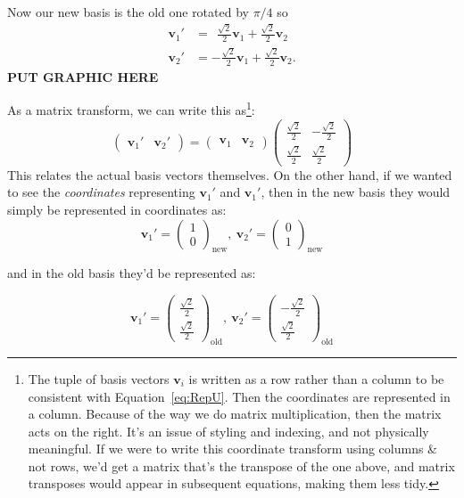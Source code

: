 	Now our new basis is the old one rotated by $\pi/4$ so 
	\begin{align*}
		\mathbf v_1' &= ~~ \frac{\sqrt 2}{2} \mathbf v_1 + \frac{\sqrt 2}{2} \mathbf v_2\\
		\mathbf v_2' &= - \frac{\sqrt 2}{2}\mathbf v_1 + \frac{\sqrt 2}{2}\mathbf v_2.
	\end{align*}
	\textbf{PUT GRAPHIC HERE}
	
	
	As a matrix transform, we can write this as\footnote{The tuple of basis vectors $\mathbf v_i$ is written as a row rather than a column to be consistent with Equation~\eqref{eq:RepU}. Then the coordinates are represented in a column. Because of the way we do matrix multiplication, then the matrix acts on the right. It's an issue of styling and indexing, and not physically meaningful. If we were to write this coordinate transform using columns \& not rows, we'd get a matrix that's the transpose of the one above, and matrix transposes would appear in subsequent equations, making them less tidy.}:
	\begin{equation*}
		\begin{pmatrix}
			\mathbf v_1' & \mathbf v_2'
		\end{pmatrix}
		= 
		\begin{pmatrix}
			\mathbf v_1 & \mathbf v_2
		\end{pmatrix}
		\begin{pmatrix}
					 \frac{\sqrt 2}{2} &  -\frac{\sqrt 2}{2} \\
					 \frac{\sqrt 2}{2} &  \frac{\sqrt 2}{2}
		\end{pmatrix}
	\end{equation*}
	This relates the actual basis vectors themselves. On the other hand, if we wanted to see the \emph{coordinates} representing $\mathbf v_1'$ and $\mathbf v_1'$, then in the new basis they would simply be represented in coordinates as: 
	\begin{equation*}
		\mathbf v_1' = \begin{pmatrix}
			1 \\ 0
		\end{pmatrix}_{\mathrm{new}}, ~
		\mathbf v_2' = \begin{pmatrix}
			0 \\ 1
		\end{pmatrix}_{\mathrm{new}}
	\end{equation*}
	
	and in the old basis they'd be represented as:
	
	\begin{equation*}
		\mathbf v_1' = \begin{pmatrix}
			\frac{\sqrt 2}{2} \\ \frac{\sqrt 2}{2}
		\end{pmatrix}_{\mathrm{old}}, ~
		\mathbf v_2' = \begin{pmatrix}
			-\frac{\sqrt 2}{2} \\ \frac{\sqrt 2}{2}
		\end{pmatrix}_{\mathrm{old}}
	\end{equation*}
		
